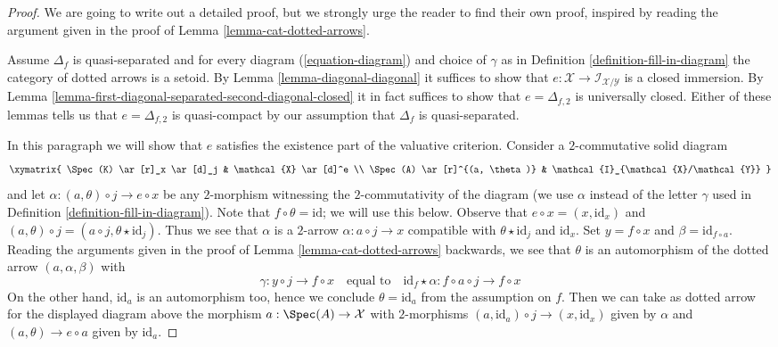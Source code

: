 \begin{proof}
We are going to write out a detailed proof, but we strongly urge the
reader to find their own proof, inspired by reading the argument
given in the proof of Lemma \ref{lemma-cat-dotted-arrows}.

\medskip\noindent
Assume $\Delta_f$ is quasi-separated and for every diagram
(\ref{equation-diagram}) and choice of $\gamma$ as in
Definition \ref{definition-fill-in-diagram}
the category of dotted arrows is a setoid.
By Lemma \ref{lemma-diagonal-diagonal} it suffices to show that
$e : \mathcal{X} \to \mathcal{I}_{\mathcal{X}/\mathcal{Y}}$
is a closed immersion. By
Lemma \ref{lemma-first-diagonal-separated-second-diagonal-closed}
it in fact suffices to show that $e = \Delta_{f, 2}$ is
universally closed.
Either of these lemmas tells us that $e = \Delta_{f, 2}$ is quasi-compact
by our assumption that $\Delta_f$ is quasi-separated.

\medskip\noindent
In this paragraph we will show that $e$ satisfies the existence
part of the valuative criterion. Consider a $2$-commutative solid diagram
$$
\xymatrix{
\Spec(K) \ar[r]_x \ar[d]_j & \mathcal{X} \ar[d]^e \\
\Spec(A) \ar[r]^{(a, \theta)} & \mathcal{I}_{\mathcal{X}/\mathcal{Y}}
}
$$
and let $\alpha : (a, \theta) \circ j \to e \circ x$ be any $2$-morphism
witnessing the $2$-commutativity of the diagram (we use $\alpha$ instead
of the letter $\gamma$ used in Definition \ref{definition-fill-in-diagram}).
Note that $f \circ \theta = \text{id}$; we will use this below.
Observe that $e \circ x = (x, \text{id}_x)$ and
$(a, \theta) \circ j = (a \circ j, \theta \star \text{id}_j)$.
Thus we see that $\alpha$ is a $2$-arrow $\alpha : a \circ j \to x$
compatible with $\theta \star \text{id}_j$ and $\text{id}_x$.
Set $y = f \circ x$ and $\beta = \text{id}_{f \circ a}$.
Reading the arguments given in the proof of
Lemma \ref{lemma-cat-dotted-arrows}
backwards, we see that $\theta$ is an automorphism of the
dotted arrow $(a, \alpha, \beta)$ with
$$
\gamma : y \circ j \to f \circ x
\quad\text{equal to}\quad
\text{id}_f \star \alpha : f \circ a \circ j \to f \circ x
$$
On the other hand, $\text{id}_a$ is an automorphism too, hence
we conclude $\theta = \text{id}_a$ from the assumption on $f$.
Then we can take as dotted arrow for the displayed diagram above
the morphism $a : \Spec(A) \to \mathcal{X}$ with $2$-morphisms
$(a, \text{id}_a) \circ j \to (x, \text{id}_x)$ given by $\alpha$
and $(a, \theta) \to e \circ a$ given by $\text{id}_a$.


\end{proof}
